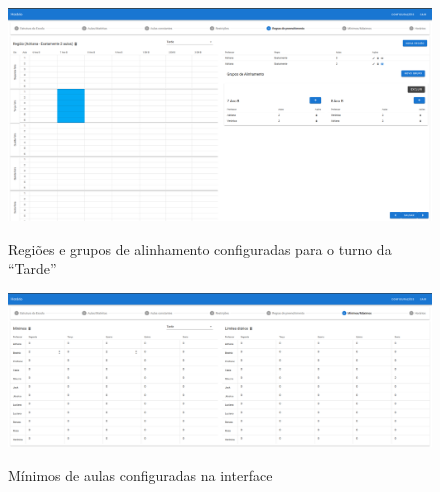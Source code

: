 \begin{figure}[p]
	\centering
	\caption{Regiões e grupos de alinhamento configuradas para o turno da ``Tarde''}
	\includegraphics[width=1\textwidth]{./dados/figuras/regioes_configuradas_tarde}
	\label{fig:regioes_configuradas_tarde}
\end{figure}

\begin{figure}[h]
	\centering
	\caption{Mínimos de aulas configuradas na interface}
	\includegraphics[width=1\textwidth]{./dados/figuras/minimos_configurados}
	\label{fig:minimos_configurados}
\end{figure}

